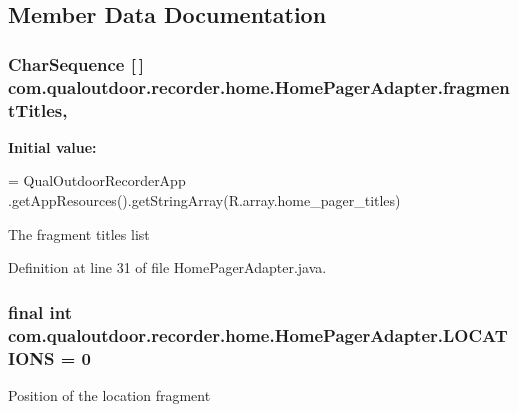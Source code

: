 \subsection{Member Data Documentation}
\hypertarget{classcom_1_1qualoutdoor_1_1recorder_1_1home_1_1HomePagerAdapter_a38a78f8e084ee728e6ea5c0abfa548f0}{
\subsubsection[{fragment\-Titles}]{\setlength{\rightskip}{0pt plus 5cm}Char\-Sequence \mbox{[}$\,$\mbox{]} com.\-qualoutdoor.\-recorder.\-home.\-Home\-Pager\-Adapter.\-fragment\-Titles\hspace{0.3cm}{\ttfamily [static]}, {\ttfamily [private]}}}\label{classcom_1_1qualoutdoor_1_1recorder_1_1home_1_1HomePagerAdapter_a38a78f8e084ee728e6ea5c0abfa548f0}
{\bfseries Initial value\-:}
\begin{DoxyCode}
= QualOutdoorRecorderApp
            .getAppResources().getStringArray(R.array.home\_pager\_titles)
\end{DoxyCode}
The fragment titles list 

Definition at line 31 of file Home\-Pager\-Adapter.\-java.

\hypertarget{classcom_1_1qualoutdoor_1_1recorder_1_1home_1_1HomePagerAdapter_a80a55359533492fff489ccf05f31737e}{
\subsubsection[{L\-O\-C\-A\-T\-I\-O\-N\-S}]{\setlength{\rightskip}{0pt plus 5cm}final int com.\-qualoutdoor.\-recorder.\-home.\-Home\-Pager\-Adapter.\-L\-O\-C\-A\-T\-I\-O\-N\-S = 0\hspace{0.3cm}{\ttfamily [static]}}}\label{classcom_1_1qualoutdoor_1_1recorder_1_1home_1_1HomePagerAdapter_a80a55359533492fff489ccf05f31737e}
Position of the location fragment 

